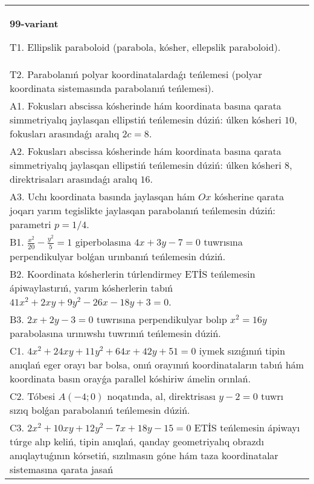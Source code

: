 \documentclass{article}
\begin{document}
\begin{tabular}{m{17cm}}
\textbf{99-variant}
\newline

T1. Ellipslik paraboloid (parabola, kósher, ellepslik paraboloid).\\

T2. Parabolanıń polyar koordinatalardaǵı teńlemesi (polyar koordinata sistemasında parabolanıń teńlemesi).\\

A1. Fokusları abscissa kósherinde hám koordinata basına qarata simmetriyalıq jaylasqan ellipstiń teńlemesin dúziń: úlken kósheri $10$, fokusları arasındaǵı aralıq $2 c=8$.\\

A2. Fokusları abscissa kósherinde hám koordinata basına qarata simmetriyalıq jaylasqan ellipstiń teńlemesin dúziń: úlken kósheri $8$, direktrisaları arasındaǵı aralıq $16$.\\

A3. Uchı koordinata basında jaylasqan hám $Ox$ kósherine qarata joqarı yarım tegislikte jaylasqan parabolanıń teńlemesin dúziń: parametri $p=1/4$.\\

B1. $\frac{x^{2}}{20} - \frac{y^{2}}{5} = 1$ giperbolasına $4x + 3y - 7 = 0$ tuwrısına perpendikulyar bolǵan urınbanıń teńlemesin dúziń.  \\

B2. Koordinata kósherlerin túrlendirmey ETİS teńlemesin ápiwaylastırıń, yarım kósherlerin tabıń $41x^{2} + 2xy + 9y^{2} - 26x - 18y + 3 = 0$.  \\

B3. $2x + 2y - 3 = 0$ tuwrısına perpendikulyar bolıp $x^{2} = 16y$ parabolasına urınıwshı tuwrınıń teńlemesin dúziń.  \\

C1. $4x^{2} + 24xy + 11y^{2} + 64x + 42y + 51 = 0$ iymek sızıǵınıń tipin anıqlań eger orayı bar bolsa, onıń orayınıń koordinataların tabıń hám koordinata basın orayǵa parallel kóshiriw ámelin orınlań.  \\

C2. Tóbesi $A(-4;0)$ noqatında, al, direktrisası $y - 2 = 0$ tuwrı sızıq bolǵan parabolanıń teńlemesin dúziń.\\

C3. $2x^{2} + 10xy + 12y^{2} - 7x + 18y - 15 = 0$ ETİS teńlemesin ápiwayı túrge alıp keliń, tipin anıqlań, qanday geometriyalıq obrazdı anıqlaytuǵının kórsetiń, sızılmasın góne hám taza koordinatalar sistemasına qarata jasań  \\

\end{tabular}
\vspace{1cm}
\end{document}
